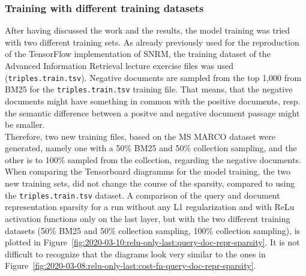 \subsubsection*{Training with different training datasets}
After having discussed the work and the results, the model training was tried with two different
    training sets.
As already previously used for the reproduction of the TensorFlow implementation of SNRM, the training 
    dataset of the Advanced Information Retrieval lecture exercise files was used (\texttt{triples.train.tsv}).
Negative documents are sampled from the top 1,000 from BM25 for the \texttt{triples.train.tsv} training file.
That means, that the negative documents might have something in common with the positive documents,
    resp. the semantic difference between a positve and negative document passage might be smaller.\\
Therefore, two new training files, based on the MS MARCO dataset were generated, namely 
    one with a 50\% BM25 and 50\% collection sampling, and the other is to 100\% sampled from the collection,
    regarding the negative documents.
When comparing the Tensorboard diagramms for the model training, the two new training sets,
    did not change the course of the sparsity, compared to using the \texttt{triples.train.tsv} dataset.
A comparison of the query and document representation sparsity for a run without any L1 regularization
    and with ReLu activation functions only on the last layer,
    but with the two different training datasets
    (50\% BM25 and 50\% collection sampling, 100\% collection sampling),
    is plotted in Figure~\ref{fig:2020-03-10:relu-only-last:query-doc-repr-sparsity}.
It is not difficult to recognize that the diagrams look very similar to the ones in 
    Figure~\ref{fig:2020-03-08:relu-only-last:cost-fn-query-doc-repr-sparsity}.

